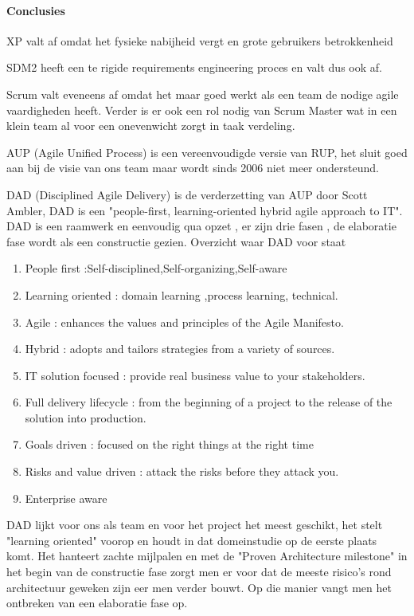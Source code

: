 	
\paragraph{Conclusies}
\begin{description}
\item XP valt af omdat het fysieke nabijheid vergt en grote gebruikers betrokkenheid
\item SDM2 heeft een te rigide requirements engineering proces en valt dus ook af.
\item Scrum valt eveneens af omdat het maar goed werkt als een team de nodige agile vaardigheden heeft. Verder is er ook een rol nodig van Scrum Master wat in een klein team al voor een onevenwicht zorgt in taak verdeling.
\item AUP (Agile Unified Process) is een vereenvoudigde versie van RUP, het sluit goed aan bij de visie van ons team maar wordt sinds 2006 niet meer ondersteund. 
\item DAD (Disciplined Agile Delivery) is de verderzetting van AUP door Scott Ambler, DAD is een "people-first, learning-oriented hybrid agile approach to IT". DAD is een raamwerk en eenvoudig qua opzet , er zijn drie fasen , de elaboratie fase wordt als een constructie gezien.   
Overzicht waar DAD voor staat 
	\begin{enumerate}
		\item People first :Self-disciplined,Self-organizing,Self-aware
		\item Learning oriented : domain learning ,process learning, technical.
		\item Agile : enhances the values and principles of the Agile Manifesto.
		\item Hybrid : adopts and tailors strategies from a variety of sources.
		\item IT solution focused :  provide real business value to your stakeholders.
		\item Full delivery lifecycle : from the beginning of a project to the release of the solution into production.
		\item Goals driven : focused on the right things at the right time
		\item Risks and value driven : attack the risks before they attack you.
		\item Enterprise aware
	\end{enumerate}
	

DAD lijkt voor ons als team en voor het project het meest geschikt, het stelt
"learning oriented" voorop en houdt in dat domeinstudie op de eerste plaats komt. Het hanteert zachte mijlpalen en met de "Proven Architecture milestone" in het begin van de constructie fase zorgt men er voor dat de meeste risico's rond architectuur geweken zijn eer men verder bouwt. Op die manier vangt men het ontbreken van een elaboratie fase op.

\end{description}





